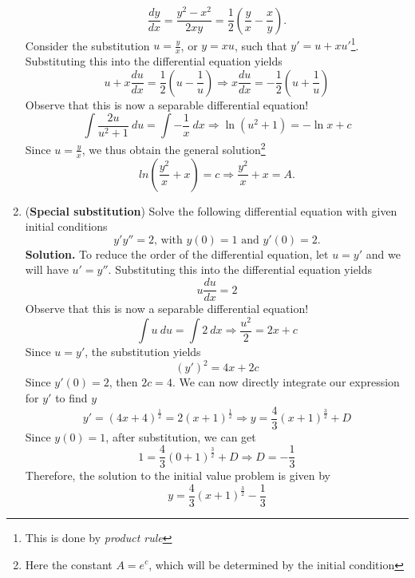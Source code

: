 \documentclass[a4paper]{article}
\begin{document}
\begin{enumerate}
    \begin{equation*}
        \frac{dy}{dx}=\frac{y^2-x^2}{2xy}=\frac{1}{2}(\frac{y}{x}-\frac{x}{y}).
    \end{equation*}
    Consider the substitution $u=\frac{y}{x}$, or $y=xu$, such that $y'=u+xu'$\footnote{This is done by \textit{product rule}}. Substituting this into the differential equation yields
    \begin{equation*}
        u+x\frac{du}{dx}=\frac{1}{2}(u-\frac{1}{u})\Rightarrow x\frac{du}{dx}=-\frac{1}{2}(u+\frac{1}{u})
    \end{equation*}
    Observe that this is now a separable differential equation!
    \begin{equation*}
        \int\frac{2u}{u^2+1}~du=\int-\frac{1}{x}~dx\Rightarrow \ln(u^2+1)=-\ln x+c
    \end{equation*}
    Since $u=\frac{y}{x}$, we thus obtain the general solution\footnote{Here the constant $A=e^c$, which will be determined by the initial condition}
    \begin{equation*}
        ln(\frac{y^2}{x}+x)=c\Rightarrow\frac{y^2}{x}+x=A.
    \end{equation*}
    \item (\textbf{Special substitution}) Solve the following differential equation with given initial conditions
    \begin{equation}
        y'y''=2\text{, with }y(0)=1\text{ and }y'(0)=2.
    \end{equation}
    \textbf{Solution.} To reduce the order of the differential equation, let $u=y'$ and we will have $u'=y''$. Substituting this into the differential equation yields
    \begin{equation*}
        u\frac{du}{dx}=2
    \end{equation*}
    Observe that this is now a separable differential equation!
    \begin{equation*}
        \int u~du=\int 2~dx \Rightarrow \frac{u^2}{2}=2x+c
    \end{equation*}
    Since $u=y'$, the substitution yields
    \begin{equation*}
        (y')^2=4x+2c
    \end{equation*}
    Since $y'(0)=2$, then $2c=4$. We can now directly integrate our expression for $y'$ to find $y$
    \begin{equation*}
        y'=(4x+4)^{\frac{1}{2}}=2(x+1)^{\frac{1}{2}}\Rightarrow y=\frac{4}{3}(x+1)^{\frac{3}{2}}+D
    \end{equation*}
    Since $y(0)=1$, after substitution, we can get
    \begin{equation*}
        1=\frac{4}{3}(0+1)^{\frac{3}{2}}+D\Rightarrow D=-\frac{1}{3}
    \end{equation*}
    Therefore, the solution to the initial value problem is given by
    \begin{equation*}
        y=\frac{4}{3}(x+1)^{\frac{3}{2}}-\frac{1}{3}
    \end{equation*}
\end{enumerate}
\end{document}
